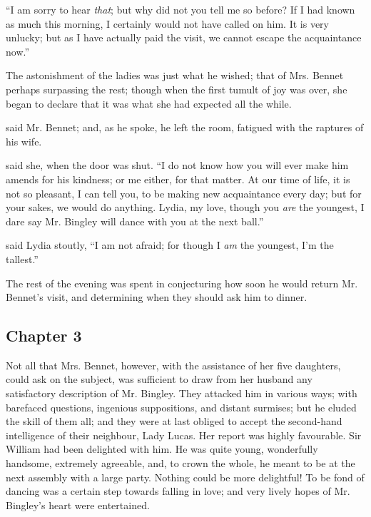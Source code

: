 “I am sorry to hear {\em that}; but why did not you tell me so before? If I had known as much this morning, I certainly would not have called on him. It is very unlucky; but as I have actually paid the visit, we cannot escape the acquaintance now.”

The astonishment of the ladies was just what he wished; that of Mrs. Bennet perhaps surpassing the rest; though when the first tumult of joy was over, she began to declare that it was what she had expected all the while.


 said Mr. Bennet; and, as he spoke, he left the room, fatigued with the raptures of his wife.

 said she, when the door was shut. “I do not know how you will ever make him amends for his kindness; or me either, for that matter. At our time of life, it is not so pleasant, I can tell you, to be making new acquaintance every day; but for your sakes, we would do anything. Lydia, my love, though you {\em are} the youngest, I dare say Mr. Bingley will dance with you at the next ball.”

 said Lydia stoutly, “I am not afraid; for though I {\em am} the youngest, I'm the tallest.”

The rest of the evening was spent in conjecturing how soon he would return Mr. Bennet's visit, and determining when they should ask him to dinner.

\subsection[chapter-3]{\useURL[url3][][][]\from[url3] Chapter 3}

Not all that Mrs. Bennet, however, with the assistance of her five daughters, could ask on the subject, was sufficient to draw from her husband any satisfactory description of Mr. Bingley. They attacked him in various ways; with barefaced questions, ingenious suppositions, and distant surmises; but he eluded the skill of them all; and they were at last obliged to accept the second-hand intelligence of their neighbour, Lady Lucas. Her report was highly favourable. Sir William had been delighted with him. He was quite young, wonderfully handsome, extremely agreeable, and, to crown the whole, he meant to be at the next assembly with a large party. Nothing could be more delightful! To be fond of dancing was a certain step towards falling in love; and very lively hopes of Mr. Bingley's heart were entertained.

